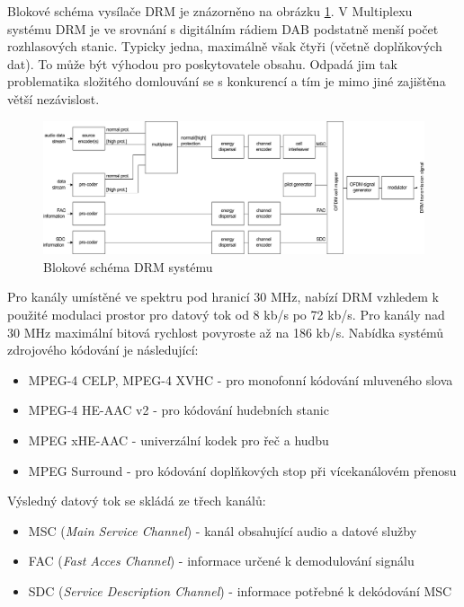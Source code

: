 
Blokové schéma vysílače DRM je znázorněno na obrázku \ref{pic:drm}. V Multiplexu systému DRM je ve srovnání s digitálním rádiem DAB podstatně menší počet rozhlasových stanic. Typicky jedna, maximálně však čtyři (včetně doplňkových dat). To může být výhodou pro poskytovatele obsahu. Odpadá jim tak problematika složitého domlouvání se s konkurencí a tím je mimo jiné zajištěna větší nezávislost. 

\begin{figure}[h]
    \centering
    \includegraphics[width=1\textwidth]{pic/drm.pdf}
    \caption{Blokové schéma DRM systému \cite{etsi:drm}}
    \label{pic:drm}
\end{figure}

Pro kanály umístěné ve spektru pod hranicí 30 MHz, nabízí DRM vzhledem k použité modulaci prostor pro datový tok od 8 kb/s po 72 kb/s. Pro kanály nad 30 MHz maximální bitová rychlost povyroste až na 186 kb/s. Nabídka systémů zdrojového kódování je následující:
\begin{itemize}
    \item MPEG-4 CELP, MPEG-4 XVHC - pro monofonní kódování mluveného slova
    \item MPEG-4 HE-AAC v2 - pro kódování hudebních stanic
    \item MPEG xHE-AAC - univerzální kodek pro řeč a hudbu
    \item MPEG Surround - pro kódování doplňkových stop při vícekanálovém přenosu
\end{itemize}

\smallskip

Výsledný datový tok se skládá ze třech kanálů:
\begin{itemize}
    \item MSC (\textit{Main Service Channel}) - kanál obsahující audio a datové služby
    \item FAC (\textit{Fast Acces Channel}) - informace určené k demodulování signálu 
    \item SDC (\textit{Service Description Channel}) - informace potřebné k dekódování MSC
\end{itemize}

